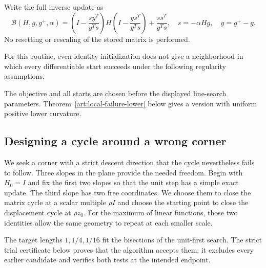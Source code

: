 Write the full inverse update as
\begin{equation}\label{art:failure_update}
 \mathcal B(H,g,g^+,\alpha)
 =\left(I-\frac{sy^T}{y^Ts}\right)H
  \left(I-\frac{ys^T}{y^Ts}\right)+\frac{ss^T}{y^Ts},
 \quad s=-\alpha Hg,\quad y=g^+-g.
\end{equation}
No resetting or rescaling of the stored matrix is performed.

For this routine, even identity initialization does not give a neighborhood
in which every differentiable start succeeds under the following regularity
assumptions.


The objective and all starts are chosen before the displayed line-search
parameters. Theorem~\ref{art:local-failure-lower} below gives a version with
uniform positive lower curvature.

\subsection{Designing a cycle around a wrong corner}
We seek a corner with a strict descent direction that the cycle nevertheless
fails to follow. Three slopes in the plane provide the needed
freedom. Begin with $H_0=I$ and fix the first two slopes so that the unit step
has a simple exact update. The third slope has two free coordinates. We choose
them to close the matrix cycle at a scalar multiple $\rho I$ and choose the
starting point to close the displacement cycle at $\rho z_0$. For the maximum
of linear functions, those two identities allow the same geometry to repeat
at each smaller scale.

The target lengths $1,1/4,1/16$ fit the bisections of the unit-first search.
The strict trial certificate below proves that the algorithm accepts them:
it excludes every earlier candidate and verifies both tests at the intended
endpoint.

